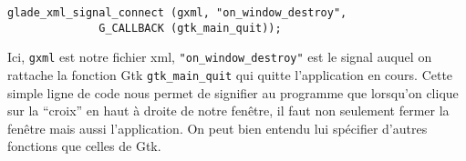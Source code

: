\documentclass[a4paper,10pt]{report}
\begin{document}
\begin{lstlisting}
glade_xml_signal_connect (gxml, "on_window_destroy",
			  G_CALLBACK (gtk_main_quit));
\end{lstlisting}

Ici, \verb!gxml! est notre fichier xml, \verb!"on_window_destroy"! est le signal auquel on rattache la fonction Gtk \verb!gtk_main_quit! qui quitte l'application en cours. Cette simple ligne de code nous permet de signifier au programme que lorsqu'on clique sur la ``croix'' en haut \`a droite de notre fen\^etre, il faut non seulement fermer la fen\^etre mais aussi l'application.
On peut bien entendu lui sp\'ecifier d'autres fonctions que celles de Gtk.

\end{document}
